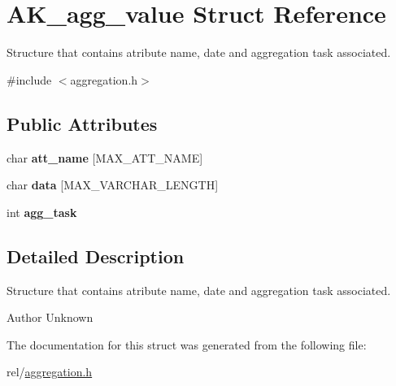 \hypertarget{structAK__agg__value}{}\section{A\+K\+\_\+agg\+\_\+value Struct Reference}
\label{structAK__agg__value}


Structure that contains atribute name, date and aggregation task associated.  




{\ttfamily \#include $<$aggregation.\+h$>$}

\subsection*{Public Attributes}
\begin{DoxyCompactItemize}
\item 
char {\bfseries att\+\_\+name} \mbox{[}M\+A\+X\+\_\+\+A\+T\+T\+\_\+\+N\+A\+ME\mbox{]}\hypertarget{structAK__agg__value_a9df4167edf419cbd33e005a390385fb8}{}\label{structAK__agg__value_a9df4167edf419cbd33e005a390385fb8}

\item 
char {\bfseries data} \mbox{[}M\+A\+X\+\_\+\+V\+A\+R\+C\+H\+A\+R\+\_\+\+L\+E\+N\+G\+TH\mbox{]}\hypertarget{structAK__agg__value_a9f87cbb26037fbabffea44d099fec5ff}{}\label{structAK__agg__value_a9f87cbb26037fbabffea44d099fec5ff}

\item 
int {\bfseries agg\+\_\+task}\hypertarget{structAK__agg__value_a3cdd683e1321dc4a9d3c5dd4900bfaa3}{}\label{structAK__agg__value_a3cdd683e1321dc4a9d3c5dd4900bfaa3}

\end{DoxyCompactItemize}


\subsection{Detailed Description}
Structure that contains atribute name, date and aggregation task associated. 

\begin{DoxyAuthor}{Author}
Unknown 
\end{DoxyAuthor}


The documentation for this struct was generated from the following file\+:\begin{DoxyCompactItemize}
\item 
rel/\hyperlink{aggregation_8h}{aggregation.\+h}\end{DoxyCompactItemize}
